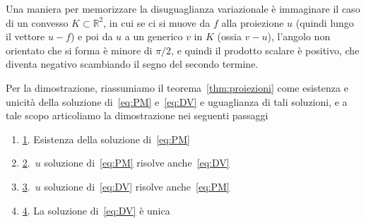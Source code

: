 \begin{remark}
    Una maniera per memorizzare la disuguaglianza variazionale è immaginare il
    caso di un convesso \(K \subset\mathbb R^2\), in cui se ci si muove da \(f\)
    alla proiezione \(u\) (quindi lungo il vettore \(u-f\)) e poi da \(u\) a un
    generico \(v\) in \(K\) (ossia \(v -u\)), l'angolo non orientato che si
    forma è minore di \(\pi/2\), e quindi il prodotto scalare è positivo, che
    diventa negativo scambiando il segno del secondo termine.
\end{remark}
Per la dimostrazione, riassumiamo il teorema~\ref{thm:proiezioni} come esistenza
e unicità della soluzione di~\eqref{eq:PM} e~\eqref{eq:DV} e uguaglianza di tali
soluzioni, e a tale scopo articoliamo la dimostrazione nei seguenti passaggi
\begin{enumerate}[label = \arabic*.]
    \item[] \hyperref[pf:Proiezioni-1]{1}. Esistenza della soluzione di~\eqref{eq:PM}
    \item[] \hyperref[pf:Proiezioni-2]{2}.~\(u\) soluzione di~\eqref{eq:PM} risolve anche~\eqref{eq:DV}
    \item[] \hyperref[pf:Proiezioni-3]{3}.~\(u\) soluzione di~\eqref{eq:DV} risolve anche~\eqref{eq:PM}
    \item[] \hyperref[pf:Proiezioni-4]{4}. La soluzione di~\eqref{eq:DV} è unica
\end{enumerate}
